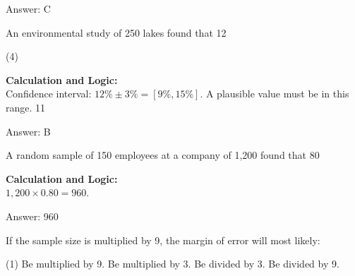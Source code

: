 \documentclass[11pt,paper=a4,answers]{exam}
\begin{document}
\begin{questions}
\begin{solution}
\vspace{30pt}

Answer: \colorbox{yellow!100}{C}
\end{solution}

\vspace{60pt}

\question
An environmental study of 250 lakes found that 12%
\begin{tasks}(4)
\end{tasks}

\begin{solution}
\textbf{Calculation and Logic:} \\
Confidence interval: $12\% \pm 3\% = [9\%, 15\%]$. A plausible value must be in this range. 11%

\vspace{30pt}

Answer: \colorbox{yellow!100}{B}
\end{solution}

\vspace{60pt}

\question
A random sample of 150 employees at a company of 1,200 found that 80%

\begin{solution}
\textbf{Calculation and Logic:} \\
$1,200 \times 0.80 = 960$.

\vspace{30pt}

Answer: \colorbox{yellow!100}{960}
\end{solution}

\vspace{60pt}

\question
If the sample size is multiplied by 9, the margin of error will most likely:
\begin{tasks}(1)
    \task Be multiplied by 9.
    \task Be multiplied by 3.
    \task Be divided by 3.
    \task Be divided by 9.
\end{tasks}


\end{questions}
\end{document}
